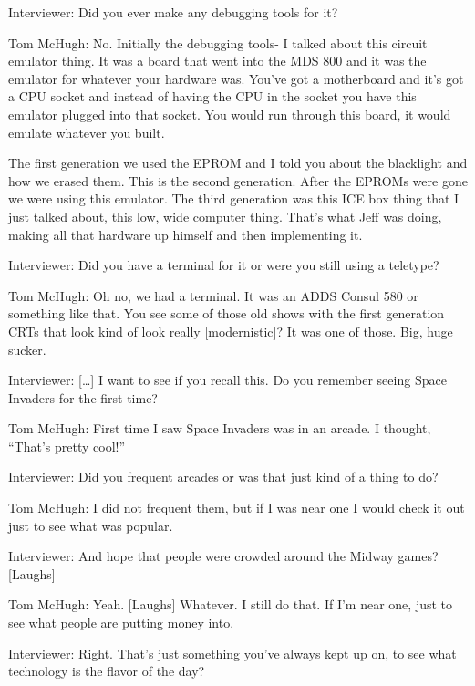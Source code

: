 \textcolor{interviewer}{Interviewer:} Did you ever make any debugging tools for it?

\textcolor{interviewee}{Tom McHugh:} No. Initially the debugging tools- I talked about this circuit emulator thing. It was a board that went into the MDS 800 and it was the emulator for whatever your hardware was. You’ve got a motherboard and it’s got a CPU socket and instead of having the CPU in the socket you have this emulator plugged into that socket. You would run through this board, it would emulate whatever you built.

The first generation we used the EPROM and I told you about the blacklight and how we erased them. This is the second generation. After the EPROMs were gone we were using this emulator. The third generation was this ICE box thing that I just talked about, this low, wide computer thing. That’s what Jeff was doing, making all that hardware up himself and then implementing it.

\textcolor{interviewer}{Interviewer:} Did you have a terminal for it or were you still using a teletype?

\textcolor{interviewee}{Tom McHugh:} Oh no, we had a terminal. It was an ADDS Consul 580 or something like that. You see some of those old shows with the first generation CRTs that look kind of look really [modernistic]? It was one of those. Big, huge sucker.

\textcolor{interviewer}{Interviewer:} […] I want to see if you recall this. Do you remember seeing Space Invaders for the first time?

\textcolor{interviewee}{Tom McHugh:} First time I saw Space Invaders was in an arcade. I thought, “That’s pretty cool!”

\textcolor{interviewer}{Interviewer:} Did you frequent arcades or was that just kind of a thing to do?

\textcolor{interviewee}{Tom McHugh:} I did not frequent them, but if I was near one I would check it out just to see what was popular.

\textcolor{interviewer}{Interviewer:} And hope that people were crowded around the Midway games? [Laughs]

\textcolor{interviewee}{Tom McHugh:} Yeah. [Laughs] Whatever. I still do that. If I’m near one, just to see what people are putting money into.

\textcolor{interviewer}{Interviewer:} Right. That’s just something you’ve always kept up on, to see what technology is the flavor of the day?

